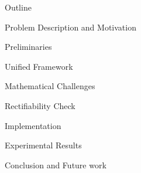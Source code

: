 \begin{frame}{\large Outline}
\bi
	\item Problem Description and Motivation
	\item Preliminaries
	\item Unified Framework
	\bi
		\item Mathematical Challenges
	\ei
	\item Rectifiability Check
	\item Implementation
	\item Experimental Results
	\item Conclusion and Future work
\ei
\end{frame}


